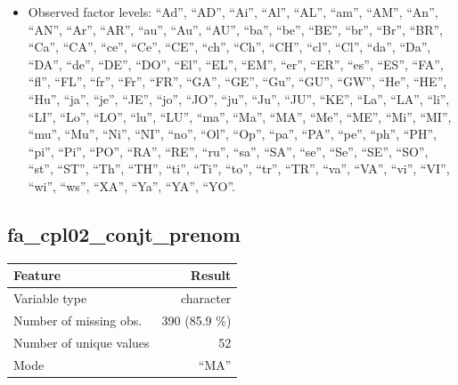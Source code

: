 \documentclass[
  letterpaper,
  DIV=11,
  numbers=noendperiod]{scrartcl}
\providecommand{\tightlist}{%
  \setlength{\itemsep}{0pt}\setlength{\parskip}{0pt}}
\begin{document}
\emini

\begin{itemize}
\tightlist
\item
  Observed factor levels: ``Ad'', ``AD'', ``Ai'', ``Al'', ``AL'',
  ``am'', ``AM'', ``An'', ``AN'', ``Ar'', ``AR'', ``au'', ``Au'',
  ``AU'', ``ba'', ``be'', ``BE'', ``br'', ``Br'', ``BR'', ``Ca'',
  ``CA'', ``ce'', ``Ce'', ``CE'', ``ch'', ``Ch'', ``CH'', ``cl'',
  ``Cl'', ``da'', ``Da'', ``DA'', ``de'', ``DE'', ``DO'', ``El'',
  ``EL'', ``EM'', ``er'', ``ER'', ``es'', ``ES'', ``FA'', ``fl'',
  ``FL'', ``fr'', ``Fr'', ``FR'', ``GA'', ``GE'', ``Gu'', ``GU'',
  ``GW'', ``He'', ``HE'', ``Hu'', ``ja'', ``je'', ``JE'', ``jo'',
  ``JO'', ``ju'', ``Ju'', ``JU'', ``KE'', ``La'', ``LA'', ``li'',
  ``LI'', ``Lo'', ``LO'', ``lu'', ``LU'', ``ma'', ``Ma'', ``MA'',
  ``Me'', ``ME'', ``Mi'', ``MI'', ``mu'', ``Mu'', ``Ni'', ``NI'',
  ``no'', ``Ol'', ``Op'', ``pa'', ``PA'', ``pe'', ``ph'', ``PH'',
  ``pi'', ``Pi'', ``PO'', ``RA'', ``RE'', ``ru'', ``sa'', ``SA'',
  ``se'', ``Se'', ``SE'', ``SO'', ``st'', ``ST'', ``Th'', ``TH'',
  ``ti'', ``Ti'', ``to'', ``tr'', ``TR'', ``va'', ``VA'', ``vi'',
  ``VI'', ``wi'', ``ws'', ``XA'', ``Ya'', ``YA'', ``YO''.
\end{itemize}

\fullline

\subsection{fa\_cpl02\_conjt\_prenom}\label{fa_cpl02_conjt_prenom}

\bminione

\begin{longtable}[]{@{}lr@{}}
\toprule\noalign{}
Feature & Result \\
\midrule\noalign{}
\endhead
\bottomrule\noalign{}
\endlastfoot
Variable type & character \\
Number of missing obs. & 390 (85.9 \%) \\
Number of unique values & 52 \\
Mode & ``MA'' \\
\end{longtable}

\emini
\bminitwo
\end{document}
